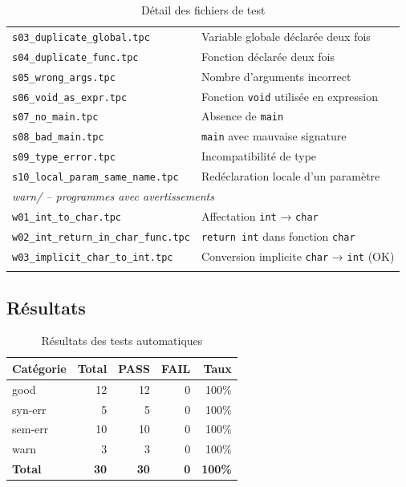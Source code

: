 \documentclass[12pt,a4paper]{article}
\begin{document}
\begin{longtable}{lp{8cm}}
\texttt{s03\_duplicate\_global.tpc}    & Variable globale déclarée deux fois \\
\texttt{s04\_duplicate\_func.tpc}      & Fonction déclarée deux fois \\
\texttt{s05\_wrong\_args.tpc}          & Nombre d'arguments incorrect \\
\texttt{s06\_void\_as\_expr.tpc}       & Fonction \texttt{void} utilisée en expression \\
\texttt{s07\_no\_main.tpc}             & Absence de \texttt{main} \\
\texttt{s08\_bad\_main.tpc}            & \texttt{main} avec mauvaise signature \\
\texttt{s09\_type\_error.tpc}          & Incompatibilité de type \\
\texttt{s10\_local\_param\_same\_name.tpc} & Redéclaration locale d'un paramètre \\
\midrule
\multicolumn{2}{l}{\textit{warn/ – programmes avec avertissements}} \\
\midrule
\texttt{w01\_int\_to\_char.tpc}            & Affectation \texttt{int} → \texttt{char} \\
\texttt{w02\_int\_return\_in\_char\_func.tpc} & \texttt{return int} dans fonction \texttt{char} \\
\texttt{w03\_implicit\_char\_to\_int.tpc}  & Conversion implicite \texttt{char} → \texttt{int} (OK) \\
\bottomrule
\caption{Détail des fichiers de test}
\end{longtable}

\subsection{Résultats}

\begin{table}[H]
\centering
\begin{tabular}{lrrrr}
\toprule
\textbf{Catégorie} & \textbf{Total} & \textbf{PASS} & \textbf{FAIL} & \textbf{Taux} \\
\midrule
good    & 12 & 12 & 0 & 100\% \\
syn-err & 5  & 5  & 0 & 100\% \\
sem-err & 10 & 10 & 0 & 100\% \\
warn    & 3  & 3  & 0 & 100\% \\
\midrule
\textbf{Total} & \textbf{30} & \textbf{30} & \textbf{0} & \textbf{100\%} \\
\bottomrule
\end{tabular}
\caption{Résultats des tests automatiques}
\end{table}
\end{document}

